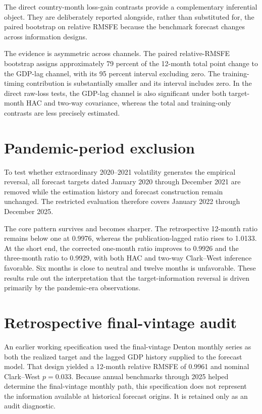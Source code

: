 \documentclass[12pt]{article}
\begin{document}


The direct country-month loss-gain contrasts provide a complementary inferential object. They are deliberately reported alongside, rather than substituted for, the paired bootstrap on relative RMSFE because the benchmark forecast changes across information designs.



The evidence is asymmetric across channels. The paired relative-RMSFE bootstrap assigns approximately 79 percent of the 12-month total point change to the GDP-lag channel, with its 95 percent interval excluding zero. The training-timing contribution is substantially smaller and its interval includes zero. In the direct raw-loss tests, the GDP-lag channel is also significant under both target-month HAC and two-way covariance, whereas the total and training-only contrasts are less precisely estimated.

\section{Pandemic-period exclusion}
To test whether extraordinary 2020--2021 volatility generates the empirical reversal, all forecast targets dated January 2020 through December 2021 are removed while the estimation history and forecast construction remain unchanged. The restricted evaluation therefore covers January 2022 through December 2025.



The core pattern survives and becomes sharper. The retrospective 12-month ratio remains below one at 0.9976, whereas the publication-lagged ratio rises to 1.0133. At the short end, the corrected one-month ratio improves to 0.9926 and the three-month ratio to 0.9929, with both HAC and two-way Clark--West inference favorable. Six months is close to neutral and twelve months is unfavorable. These results rule out the interpretation that the target-information reversal is driven primarily by the pandemic-era observations.

\section{Retrospective final-vintage audit}
An earlier working specification used the final-vintage Denton monthly series as both the realized target and the lagged GDP history supplied to the forecast model. That design yielded a 12-month relative RMSFE of 0.9961 and nominal Clark--West $p=0.033$. Because annual benchmarks through 2025 helped determine the final-vintage monthly path, this specification does not represent the information available at historical forecast origins. It is retained only as an audit diagnostic.
\end{document}

